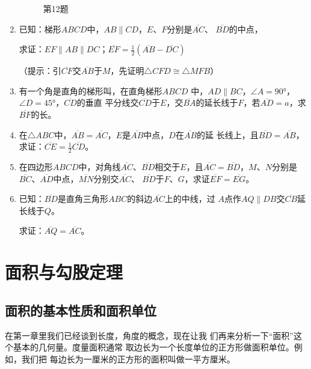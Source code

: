 \begin{enumerate}
\begin{figure}
\begin{minipage}[t]{0.48\linewidth}
\begin{tikzpicture}[>=latex, scale=1]
    \end{tikzpicture}
    \caption*{第12题}
    \end{minipage}
    \end{figure}

\item 已知：梯形$ABCD$中，$AB\parallel CD$，$E$、$F$分别是$\overline{AC}$、
$\overline{BD}$的中点，

求证：$EF\parallel AB\parallel DC$；$\overline{EF}=\frac{1}{2}(\overline{AB}-\overline{DC})$

（提示：引$\overline{CF}$交$\overline{AB}$于$M$，先证明$\triangle CFD\cong \triangle MFB$）
\item 有一个角是直角的梯形叫，在直角梯形$ABCD$
中，$AD\parallel BC$，$\angle A=\ang{90}$，$\angle D=\ang{45}$，$\overline{CD}$的垂直
平分线交$\overline{CD}$于$E$，交$\overline{BA}$的延长线于$F$，若$\overline{AD}=a$，求
$\overline{BF}$的长。
\item 在$\triangle ABC$中，$\overline{AB}=\overline{AC}$，$E$是$\overline{AB}$中点，$D$在$\overline{AB}$的延
长线上，且$\overline{BD}=\overline{AB}$，求证：$\overline{CE}=\frac{1}{2}\overline{CD}$。
\item 在四边形$ABCD$中，对角线$\overline{AC}$、$\overline{BD}$相交于$E$，且$\overline{AC}=\overline{BD}$，$M$、$N$分别是$\overline{BC}$、$\overline{AD}$中点，$\overline{MN}$分别交$\overline{AC}$、
$\overline{BD}$于$F$、$G$，求证$\overline{EF}=\overline{EG}$。
\item 已知：$\overline{BD}$是直角三角形$ABC$的斜边$\overline{AC}$上的中线，过
$A$点作$AQ\parallel DB$交$\overline{CB}$延长线于$Q$。

求证：$\overline{AQ}=\overline{AC}$。

\end{enumerate}


\section{面积与勾股定理}


\subsection{面积的基本性质和面积单位}
在第一章里我们已经谈到长度，角度的概念，现在让我
们再来分析一下“面积”这个基本的几何量。度量面积通常
取边长为一个长度单位的正方形做面积单位。例如，我们把
每边长为一厘米的正方形的面积叫做一平方厘米。

